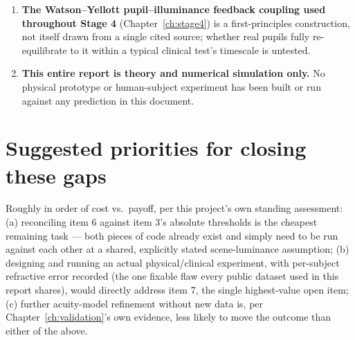 \begin{enumerate}
  (Chapter~\ref{ch:validation}). This is confirmed, not assumed, and is diagnosed as
  predominantly (though evidence suggests not entirely) a data-scarcity problem: more
  and better public clinical data, not further model tuning, is what this needs.
\item \textbf{The Watson--Yellott pupil--illuminance feedback coupling used throughout
  Stage 4} (Chapter~\ref{ch:stage4}) is a first-principles construction, not itself
  drawn from a single cited source; whether real pupils fully re-equilibrate to it
  within a typical clinical test's timescale is untested.
\item \textbf{This entire report is theory and numerical simulation only.} No physical
  prototype or human-subject experiment has been built or run against any prediction
  in this document.
\end{enumerate}

\section{Suggested priorities for closing these gaps}

Roughly in order of cost vs.\ payoff, per this project's own standing assessment:
(a) reconciling item 6 against item 3's absolute thresholds is the cheapest remaining
task --- both pieces of code already exist and simply need to be run against each
other at a shared, explicitly stated scene-luminance assumption; (b) designing and
running an actual physical/clinical experiment, with per-subject refractive error
recorded (the one fixable flaw every public dataset used in this report shares), would
directly address item 7, the single highest-value open item; (c) further acuity-model
refinement without new data is, per Chapter~\ref{ch:validation}'s own evidence, less
likely to move the outcome than either of the above.
